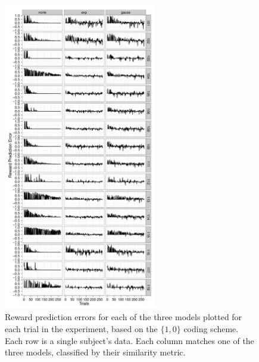 \documentclass[doc,12pt]{apa}        %
\begin{document}
\begin{figure}[tp]
	\includegraphics[width=0.6\textwidth]{f_rpe_acc}
    \centering
	\caption{Reward prediction errors for each of the three models plotted for each trial in the experiment, based on the $\{1,0\}$ coding scheme.  Each row is a single subject's data.  Each column matches one of the three models, classified by their similarity metric.}
	\label{fig:rpeacc}
\end{figure}
\end{document}
